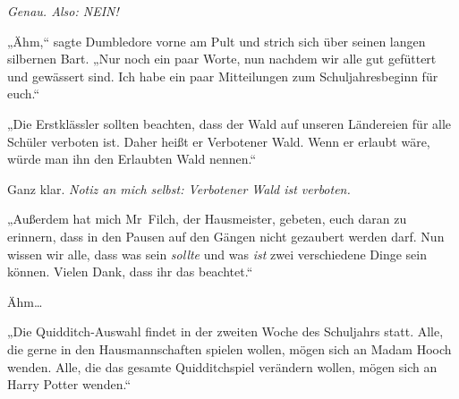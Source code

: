 \emph{Genau. Also: NEIN!}

„Ähm,“ sagte Dumbledore vorne am Pult und strich sich über seinen langen silbernen Bart. „Nur noch ein paar Worte, nun nachdem wir alle gut gefüttert und gewässert sind. Ich habe ein paar Mitteilungen zum Schuljahresbeginn für euch.“

„Die Erstklässler sollten beachten, dass der Wald auf unseren Ländereien für alle Schüler verboten ist. Daher heißt er Verbotener Wald. Wenn er erlaubt wäre, würde man ihn den Erlaubten Wald nennen.“

Ganz klar. \emph{Notiz an mich selbst: Verbotener Wald ist verboten.}

„Außerdem hat mich Mr~Filch, der Hausmeister, gebeten, euch daran zu erinnern, dass in den Pausen auf den Gängen nicht gezaubert werden darf. Nun wissen wir alle, dass was sein \emph{sollte} und was \emph{ist} zwei verschiedene Dinge sein können. Vielen Dank, dass ihr das beachtet.“


Ähm…

„Die Quidditch-Auswahl findet in der zweiten Woche des Schuljahrs statt. Alle, die gerne in den Hausmannschaften spielen wollen, mögen sich an Madam Hooch wenden. Alle, die das gesamte Quidditchspiel verändern wollen, mögen sich an Harry Potter wenden.“

